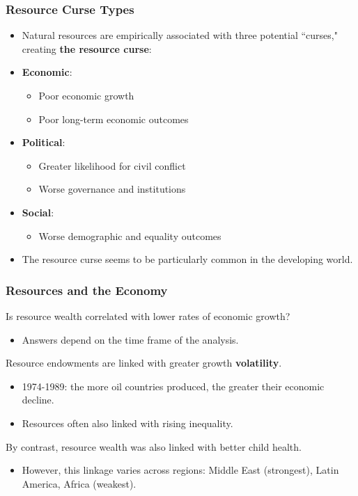 \documentclass[handout]{beamer}
\begin{document}
\begin{frame} 
	\frametitle{\LARGE{Resource Curse Types}}
	\begin{itemize}
		\item Natural resources are empirically associated with three potential ``curses," creating \textbf{the resource curse}: \pause 
		\item \textbf{Economic}: \pause 
		\begin{itemize}
			\item Poor economic growth \pause 
			\item Poor long-term economic outcomes \pause 
		\end{itemize}
		\item \textbf{Political}:  \pause 
		\begin{itemize}
			\item Greater likelihood for civil conflict \pause 
			\item Worse governance and institutions  \pause 
		\end{itemize}
		\item \textbf{Social}:  \pause 
		\begin{itemize}
			\item Worse demographic and equality outcomes  \pause 
		\end{itemize}
		\item The resource curse seems to be particularly common in the developing world.
	\end{itemize}
\end{frame}





\begin{frame} 
	\frametitle{\LARGE{Resources and the Economy}}
	\begin{itemize}
		\large{
			\item Is resource wealth correlated with lower rates of economic growth?  \pause 
			\begin{itemize}
				\item Answers depend on the time frame of the analysis.  \pause 
			\end{itemize}
			\item Resource endowments are linked with greater growth \textbf{volatility}. \pause 
			\begin{itemize}
				\item 1974-1989: the more oil countries produced, the greater their economic decline. \pause 
				\item Resources often also linked with rising inequality. \pause 
			\end{itemize}
			\item By contrast, resource wealth was also linked with better child health. \pause 
			\begin{itemize}
				\item However, this linkage varies across regions: Middle East (strongest), Latin America, Africa (weakest).
			\end{itemize}
		}
	\end{itemize}
\end{frame}
\end{document}
